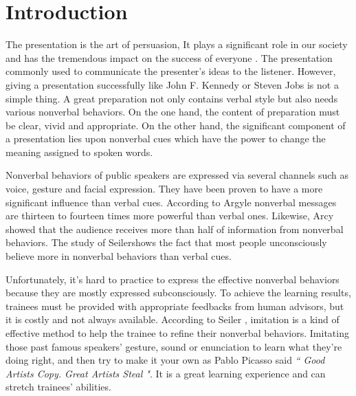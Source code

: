 \chapter{Introduction}
\par The presentation is the art of persuasion, It plays a significant role in our society and has the tremendous impact on the success of everyone \cite{seiler2002communication}. The presentation commonly used to communicate the presenter's ideas to the listener. However, giving a presentation successfully like John F. Kennedy or Steven Jobs is not a simple thing. A great preparation not only contains verbal style but also needs various nonverbal behaviors. On the one hand, the content of preparation must be clear, vivid and appropriate\cite{rodman1996style}. On the other hand, the significant component of a presentation lies upon nonverbal cues which have the power to change the meaning assigned to spoken words\cite{seiler2002communication}. 
\par Nonverbal behaviors of public speakers are expressed via several channels such as voice, gesture and facial expression. They have been proven to have a more significant influence than verbal cues. According to Argyle nonverbal messages are thirteen to fourteen times more powerful than verbal ones\cite{argyle1971communication}. Likewise, Arcy showed that the audience receives more than half of information from nonverbal behaviors\cite{d1998communicating}. The study of Seiler\cite{seiler2002communication}shows the fact that most people unconsciously believe more in nonverbal behaviors than verbal cues.
\par Unfortunately, it's hard to practice to express the effective nonverbal behaviors because they are mostly expressed subconsciously. To achieve the learning results, trainees must be provided with appropriate feedbacks from human advisors, but it is costly and not always available. According to Seiler \cite{seiler2002communication}, imitation is a kind of effective method to help the trainee to refine their nonverbal behaviors. Imitating those past famous speakers' gesture, sound or enunciation to learn what they're doing right, and then try to make it your own as Pablo Picasso said \emph{`` Good Artists Copy. Great Artists Steal "}. It is a great learning experience and can stretch trainees' abilities.

